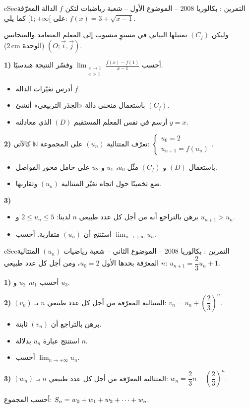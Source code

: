 \documentclass[12pt,a4paper]{article}
\newenvironment{BOX}[2]{\begin{otherlanguage}{english}\begin{arbox}{#1}{#2}}{\end{arbox}\end{otherlanguage}}
\newcounter{exo}
\newenvironment{tamrin}[1]{\stepcounter{exo}\begin{BOX}{cSec}{التمرين \theexo: #1}}{\end{BOX}}
\renewcommand{\cdots}{\mathinner{\cdotp\cdotp\cdotp}}
\newcommand{\N}{\mathbb{N}}
\newcommand{\limn}{\displaystyle\lim_{n\to+\infty}}
\newenvironment{sq}{\begin{itemize}[leftmargin=2.4em,itemsep=3pt]}{\end{itemize}}
\newcommand{\qa}{\item[(أ)]}\newcommand{\qb}{\item[(ب)]}\newcommand{\qc}{\item[(جـ)]}\newcommand{\qd}{\item[(د)]}\newcommand{\qe}{\item[(هـ)]}
\begin{document}
\begin{tamrin}{بكالوريا 2008 -- الموضوع الأول -- شعبة رياضيات}
لتكن $f$ الدالة المعرّفة على $[1;+\infty[$ كما يلي: $f(x)=3+\sqrt{x-1}$.

وليكن $(C_f)$ تمثيلها البياني في مستوٍ منسوب إلى المعلم المتعامد والمتجانس $(O;\vec{i},\vec{j})$ (الوحدة $2\,\text{cm}$).

\textbf{1)} أحسب $\displaystyle\lim_{\substack{x\to1\\x>1}}\frac{f(x)-f(1)}{x-1}$ وفسّر النتيجة هندسيًا.
\begin{itemize}
\item أدرس تغيّرات الدالة $f$.
\item باستعمال منحنى دالة «الجذر التربيعي» أنشئ $(C_f)$.
\item أرسم في نفس المعلم المستقيم $(D)$ الذي معادلته $y=x$.
\end{itemize}
\textbf{2)} نعرّف المتتالية $(u_n)$ على المجموعة $\N$ كالآتي: $\begin{cases}u_0=2\\u_{n+1}=f(u_n)\end{cases}$.
\begin{sq}
\qa باستعمال $(D)$ و $(C_f)$ مثّل $u_0$، $u_1$ و $u_2$ على حامل محور الفواصل.
\qb ضع تخمينًا حول اتجاه تغيّر المتتالية $(u_n)$ وتقاربها.
\end{sq}
\textbf{3)}
\begin{sq}
\qa برهن بالتراجع أنه من أجل كل عدد طبيعي $n$ لدينا: $2\leqslant u_n\leqslant5$ و $u_{n+1}>u_n$.
\qb استنتج أن $(u_n)$ متقاربة. أحسب $\limn u_n$.
\end{sq}
\end{tamrin}

\begin{tamrin}{بكالوريا 2008 -- الموضوع الثاني -- شعبة رياضيات}
$(u_n)$ المتتالية المعرّفة بحدها الأول $u_0=2$، ومن أجل كل عدد طبيعي $n$: $u_{n+1}=\dfrac{2}{3}u_n+1$.

\textbf{1)} أحسب $u_1$، $u_2$ و $u_3$.

\textbf{2)} $(v_n)$ المتتالية المعرّفة من أجل كل عدد طبيعي $n$ بـ: $v_n=u_n+\left(\dfrac{2}{3}\right)^{n}$.
\begin{itemize}
\item برهن بالتراجع أن $(v_n)$ ثابتة.
\item استنتج عبارة $u_n$ بدلالة $n$.
\item أحسب $\limn u_n$.
\end{itemize}
\textbf{3)} $(w_n)$ المتتالية المعرّفة من أجل كل عدد طبيعي $n$ بـ: $w_n=\dfrac{2}{3}n-\left(\dfrac{2}{3}\right)^{n}$.

أحسب المجموع: $S_n=w_0+w_1+w_2+\cdots+w_n$.
\end{tamrin}
\end{document}
